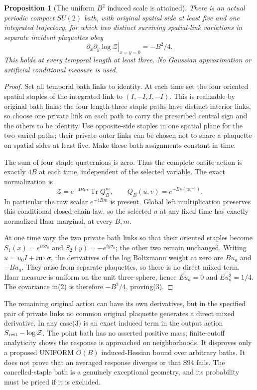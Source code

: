 \documentclass{article}
\newtheorem{proposition}{Proposition}
\begin{document}
\begin{proposition}[The uniform $B^2$ induced scale is attained]
There is an actual periodic compact $SU(2)$ bath, with original spatial side at least five and one integrated trajectory, for which two distinct surviving spatial-link variations in separate incident plaquettes obey
\[
 \left.\partial_x\partial_y\log\mathcal Z\right|_{x=y=0}
 =-B^2/4.                                            \tag{3}
\]
This holds at every temporal length at least three. No Gaussian approximation or artificial conditional measure is used.
\end{proposition}
\begin{proof}
Set all temporal bath links to identity. At each time set the four oriented spatial staples of the integrated link to $(I,-I,I,-I)$. This is realizable by original bath links: the four length-three staple paths have distinct interior links, so choose one private link on each path to carry the prescribed central sign and the others to be identity. Use opposite-side staples in one spatial plane for the two varied paths; their private outer links can be chosen not to share a plaquette on spatial sides at least five. Make these bath assignments constant in time.

The sum of four staple quaternions is zero. Thus the complete onsite action is exactly $4B$ at each time, independent of the selected variable. The exact normalization is
\[
 \mathcal Z=e^{-4Bm}\operatorname{Tr}Q_B^m,
 \qquad Q_B(u,v)=e^{-Bs(uv^{-1})}.                    \tag{4}
\]
In particular the raw scalar $e^{-4Bm}$ is present. Global left multiplication preserves this conditional closed-chain law, so the selected $u$ at any fixed time has exactly normalized Haar marginal, at every $B,m$.

At one time vary the two private bath links so that their oriented staples become
$S_1(x)=e^{ix\sigma_a}$ and $S_2(y)=-e^{iy\sigma_a}$; the other two remain unchanged. Writing $u=u_0 I+i\mathbf u\cdot\sigma$, the derivatives of the log Boltzmann weight at zero are $B u_a$ and $-B u_a$. They arise from separate plaquettes, so there is no direct mixed term. Haar measure is uniform on the unit three-sphere, hence $E u_a=0$ and $E u_a^2=1/4$. The covariance in(2) is therefore $-B^2/4$, proving(3).
\end{proof}

The remaining original action can have its own derivatives, but in the specified pair of private links no common original plaquette generates a direct mixed derivative. In any case(3) is an exact induced term in the output action $S_{\rm rest}-\log\mathcal Z$. The point bath has no asserted positive mass; finite-cutoff analyticity shows the response is approached on neighborhoods. It disproves only a proposed UNIFORM $O(B)$ induced-Hessian bound over arbitrary baths. It does not prove that an averaged response diverges or that S94 fails. The cancelled-staple bath is a genuinely exceptional geometry, and its probability must be priced if it is excluded.
\end{document}

